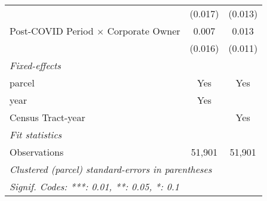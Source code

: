 \begin{table}[htbp]
\begin{tabular}{lcc}
                                                  & (0.017)                   & (0.013)\\   
      Post-COVID Period $\times$ Corporate Owner  & 0.007                     & 0.013\\   
                                                  & (0.016)                   & (0.011)\\   
      \midrule
      \emph{Fixed-effects}\\
      parcel                                      & Yes                       & Yes\\  
      year                                        & Yes                       & \\  
      Census Tract-year                           &                           & Yes\\  
      \midrule
      \emph{Fit statistics}\\
      Observations                                & 51,901                    & 51,901\\  
      \midrule \midrule
      \multicolumn{3}{l}{\emph{Clustered (parcel) standard-errors in parentheses}}\\
      \multicolumn{3}{l}{\emph{Signif. Codes: ***: 0.01, **: 0.05, *: 0.1}}\\
   \end{tabular}
\end{table}
